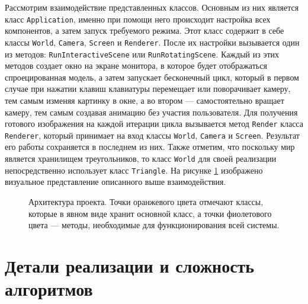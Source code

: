 \documentclass{article}
\begin{document}
Рассмотрим взаимодействие представленных классов.
Основным из них является класс \verb"Application", именно при помощи него происходит настройка всех компонентов, а затем запуск требуемого режима.
Этот класс содержит в себе классы \verb"World", \verb"Camera", \verb"Screen" и \verb"Renderer".
После их настройки вызывается один из методов: \verb"RunInteractiveScene" или \verb"RunRotatingScene".
Каждый из этих методов создает окно на экране монитора, в которое будет отображаться спроецированная модель, а затем запускает бесконечный цикл, который в первом случае при нажатии клавиш клавиатуры перемещает или поворачивает камеру, тем самым изменяя картинку в окне, а во втором --- самостоятельно вращает камеру, тем самым создавая анимацию без участия пользователя.
Для получения готового изображения на каждой итерации цикла вызывается метод \verb"Render" класса \verb"Renderer", который принимает на вход классы \verb"World", \verb"Camera" и \verb"Screen".
Результат его работы сохраняется в последнем из них.
Также отметим, что поскольку мир является хранилищем треугольников, то класс \verb"World" для своей реализации непосредственно использует класс \verb"Triangle".
На рисунке \ref{architecture} изображено визуальное представление описанного выше взаимодействия.

\begin{figure}[ht]
    \caption{Архитектура проекта. Точки оранжевого цвета отмечают классы, которые в явном виде хранит основной класс, а точки фиолетового цвета --- методы, необходимые для функционирования всей системы.}
    \label{architecture}
\end{figure}

\newpage

\section{Детали реализации и сложность алгоритмов}
\end{document}
